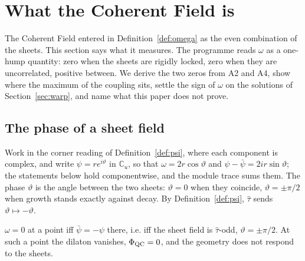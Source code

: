 
\section{What the Coherent Field is}\label{sec:omega-shape}

The Coherent Field entered in Definition~\ref{def:omega} as the even
combination of the sheets. This section says what it measures. The
programme reads $\omega$ as a one-hump quantity: zero when the sheets are
rigidly locked, zero when they are uncorrelated, positive between. We
derive the two zeros from A2 and A4, show where the maximum of the
coupling sits, settle the sign of $\omega$ on the solutions of
Section~\ref{sec:warp}, and name what this paper does not prove.

\subsection{The phase of a sheet field}\label{sec:phase}

Work in the corner reading of Definition~\ref{def:psi}, where each
component is complex, and write $\psi=re^{i\vartheta}$ in $\mathbb{C}_{u}$,
so that $\omega=2r\cos\vartheta$ and $\psi-\bar\psi=2ir\sin\vartheta$; the
statements below hold componentwise, and the module trace sums them. The phase
$\vartheta$ is the angle between the two sheets: $\vartheta=0$ when they
coincide, $\vartheta=\pm\pi/2$ when growth stands exactly against decay.
By Definition~\ref{def:psi}, $\hat\tau$ sends $\vartheta\mapsto-\vartheta$.

\begin{proposition}\label{prop:locked}
$\omega=0$ at a point iff $\bar\psi=-\psi$ there, i.e. iff the sheet field
is $\hat\tau$-odd, $\vartheta=\pm\pi/2$. At such a point the dilaton
vanishes, $\Phi_{\mathrm{QC}}=0$, and the geometry does not respond to the sheets.
\end{proposition}

